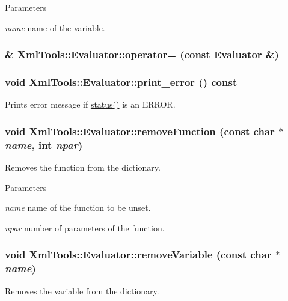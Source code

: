 \begin{DoxyParams}{Parameters}
\item[{\em name}]name of the variable. \end{DoxyParams}
\hypertarget{class_xml_tools_1_1_evaluator_a78e101bcb596a10ca44871fd3250b0ca}{
\subsubsection[{operator=}]{\& XmlTools::Evaluator::operator= (const {\bf Evaluator} \&)}}
\label{class_xml_tools_1_1_evaluator_a78e101bcb596a10ca44871fd3250b0ca}
\hypertarget{class_xml_tools_1_1_evaluator_ad034901d9b832062c7413e698031214e}{
\subsubsection[{print\_\-error}]{\setlength{\rightskip}{0pt plus 5cm}void XmlTools::Evaluator::print\_\-error () const}}
\label{class_xml_tools_1_1_evaluator_ad034901d9b832062c7413e698031214e}
Prints error message if \hyperlink{class_xml_tools_1_1_evaluator_a2bb48b05d692c7b2f32d7ef8996ef835}{status()} is an ERROR. \hypertarget{class_xml_tools_1_1_evaluator_ac9c3b846be94d03ab2c06c68b4a86448}{
\subsubsection[{removeFunction}]{\setlength{\rightskip}{0pt plus 5cm}void XmlTools::Evaluator::removeFunction (const char $\ast$ {\em name}, \/  int {\em npar})}}
\label{class_xml_tools_1_1_evaluator_ac9c3b846be94d03ab2c06c68b4a86448}
Removes the function from the dictionary.


\begin{DoxyParams}{Parameters}
\item[{\em name}]name of the function to be unset. \item[{\em npar}]number of parameters of the function. \end{DoxyParams}
\hypertarget{class_xml_tools_1_1_evaluator_a1fbc17d2bdbda88525e309098ba52563}{
\subsubsection[{removeVariable}]{\setlength{\rightskip}{0pt plus 5cm}void XmlTools::Evaluator::removeVariable (const char $\ast$ {\em name})}}
\label{class_xml_tools_1_1_evaluator_a1fbc17d2bdbda88525e309098ba52563}
Removes the variable from the dictionary.


